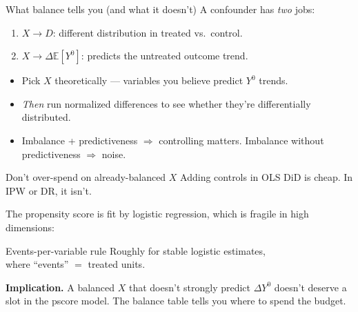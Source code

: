 \documentclass[aspectratio=169,11pt]{beamer}
\begin{document}
\begin{frame}{What balance tells you (and what it doesn't)}
\vspace{0.5em}
A confounder has \textit{two} jobs:
\vspace{0.5em}
\begin{enumerate}
  \item $X \to D$: \;different distribution in treated vs.\ control.
  \item $X \to \Delta\mathbb{E}[Y^0]$: \;predicts the untreated outcome trend.
\end{enumerate}
\vspace{0.6em}
\vspace{0.5em}
\begin{itemize}\small
  \item Pick $X$ theoretically --- variables you believe predict $Y^0$ trends.
  \item \textit{Then} run normalized differences to see whether they're differentially distributed.
  \item Imbalance + predictiveness $\Rightarrow$ controlling matters. \;Imbalance without predictiveness $\Rightarrow$ noise.
\end{itemize}
\end{frame}

\begin{frame}{Don't over-spend on already-balanced $X$}
\vspace{0.5em}
Adding controls in OLS DiD is cheap. \;In IPW or DR, it isn't.

\vspace{0.6em}
The propensity score is fit by logistic regression, which is fragile in high dimensions:

\vspace{0.5em}
\begin{block}{Events-per-variable rule}
\centering
Roughly  for stable logistic estimates, \\ where ``events'' $=$ treated units.
\end{block}

\vspace{0.6em}
\textbf{Implication.} \;A balanced $X$ that doesn't strongly predict $\Delta Y^0$ doesn't deserve a slot in the pscore model. \;The balance table tells you where to spend the budget.
\end{frame}
\end{document}
